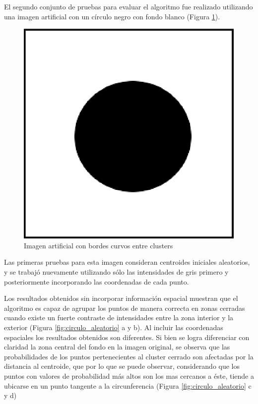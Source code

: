 El segundo conjunto de pruebas para evaluar el algoritmo fue realizado utilizando una imagen artificial con un círculo negro con fondo blanco  (Figura \ref{fig:circulo}).

\begin{figure}[H]
\centering
\includegraphics[scale=0.3]{images/circulo_250x250.eps}
\caption{Imagen artificial con bordes curvos entre clusters}
\label{fig:circulo}
\end{figure}

Las primeras pruebas para esta imagen consideran centroides iniciales aleatorios, y se trabajó nuevamente utilizando sólo las intensidades de gris primero y posteriormente incorporando las coordenadas de cada punto.

Los resultados obtenidos sin incorporar información espacial muestran que el algoritmo es capaz de agrupar los puntos de manera correcta en zonas cerradas cuando existe un fuerte contraste de intensidades entre la zona interior y la exterior (Figura \ref{fig:circulo_aleatorio} a y b). Al incluir las coordenadas espaciales los resultados obtenidos son diferentes. Si bien se logra diferenciar con claridad la zona central del fondo en la imagen original, se observa que las probabilidades de los puntos pertenecientes al cluster cerrado son afectadas por la distancia al centroide, que por lo que se puede observar, considerando que los puntos con valores de probabilidad más altos son los mas cercanos a éste, tiende a ubicarse en un punto tangente a la circunferencia (Figura \ref{fig:circulo_aleatorio} c y d)

